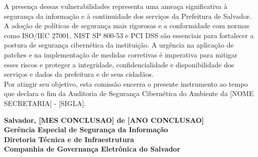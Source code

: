 \documentclass[a4paper,12pt]{article}
\begin{document}
A presença dessas vulnerabilidades representa uma ameaça significativa à segurança da informação e à continuidade dos serviços da Prefeitura de Salvador.
A adoção de políticas de segurança mais rigorosas e a conformidade com normas como ISO/IEC 27001, NIST SP 800-53 e PCI DSS são essenciais para fortalecer a postura de segurança cibernética da instituição.
A urgência na aplicação de patches e na implementação de medidas corretivas é imperativa para mitigar esses riscos e proteger a integridade, confidencialidade e disponibilidade dos serviços e dados da prefeitura e de seus cidadãos.\\

Por atingir seu objetivo, esta comissão encerra o presente instrumento ao tempo que declara o fim da Auditoria de Segurança Cibernética do Ambiente da [NOME SECRETARIA] - [SIGLA].

\vspace*{\fill} %
\begin{flushright}
\textbf{Salvador, [MES CONCLUSAO] de [ANO CONCLUSAO] \\%
Gerência Especial de Segurança da Informação \\%
Diretoria Técnica e de Infraestrutura \\%
Companhia de Governança Eletrônica do Salvador}
\end{flushright}
\end{document}
